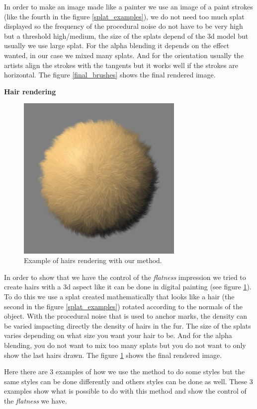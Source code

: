 In order to make an image made like a painter we use an image of a paint strokes (like the fourth in the figure \ref{splat_examples}), we do not need too much splat displayed so the frequency of the procedural noise do not have to be very high but a threshold high/medium, the size of the splats depend of the 3d model but usually we use large splat. For the alpha blending it depends on the effect wanted, in our case we mixed many splats. And for the orientation usually the artists align the strokes with the tangents but it works well if the strokes are horizontal. The figure \ref{final_brushes} shows the final rendered image. \newline

\textbf{Hair rendering}

\begin{figure}[H]
    \begin{center}
    \includegraphics[width=80mm, height=80mm]{Resultats/bouledepoil1/final.png}
    \end{center}
    \caption{Example of hairs rendering with our method.}
    \label{final_hair}
\end{figure}

In order to show that we have the control of the \textit{flatness} impression we tried to create hairs with a 3d aspect like it can be done in digital painting (see figure \ref{final_hair}). To do this we use a splat created mathematically that looks like a hair (the second in the figure \ref{splat_examples}) rotated according to the normals of the object. With the procedural noise that is used to anchor marks, the density can be varied impacting directly the density of hairs in the fur. The size of the splats varies depending on what size you want your hair to be. And for the alpha blending, you do not want to mix too many splats but you do not want to only show the last hairs drawn. The figure \ref{final_hair} shows the final rendered image. \newline

Here there are 3 examples of how we use the method to do some styles but the same styles can be done differently and others styles can be done as well. These 3 examples show what is possible to do with this method and show the control of the \textit{flatness} we have.
